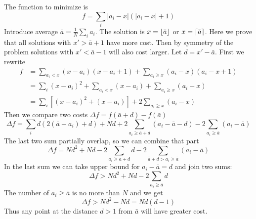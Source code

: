 \documentclass[a4paper,11pt]{article}
\DeclarePairedDelimiter\ceil{\lceil}{\rceil}
\DeclarePairedDelimiter\floor{\lfloor}{\rfloor}
\newcommand{\abs}[1]{\lvert #1 \rvert}
\begin{document}
The function to minimize is
\begin{equation}
  f = \sum_i \abs{a_i - x} (\abs{a_i - x} + 1)
\end{equation}
Introduce average $\bar{a}=\frac{1}{N}\sum_i a_i$.
The solution is $x=\floor{\bar a}$ or $x=\ceil{\bar a}$.
Here we prove that all solutions with $x'>\bar{a}+1$ have more cost.
Then by symmetry of the problem solutions with $x'<\bar{a}-1$ will also cost larger. Let $d=x'-\bar{a}$.
First we rewrite
\begin{align}
  f & = \sum_{a_i < x} (x - a_i)(x - a_i + 1) + \sum_{a_i \geq x} (a_i - x)(a_i - x + 1) \\
    & = \sum_i (x - a_i)^2 +  \sum_{a_i < x} (x - a_i) + \sum_{a_i \geq x} (a_i - x) \\
    & = \sum_i [ (x - a_i)^2 +  (x - a_i) ] + 2\sum_{a_i \geq x} (a_i - x)
\end{align}
Then we compare two costs $\Delta f = f(\bar{a} + d) - f(\bar{a})$
\begin{equation}
  \Delta f = \sum_i d (2 (\bar{a} - a_i) +d) + Nd 
  +2\sum_{a_i \geq \bar{a}+d } (a_i -\bar{a}-d)  -2\sum_{a_i\geq{\bar a}} (a_i -\bar{a}) 
\end{equation}
The last two sum partially overlap, so we can combine that part
\begin{equation}
  \Delta f = Nd^2 + Nd 
  -2\sum_{a_i \geq \bar{a}+d }d  -2\sum_{\bar{a} + d > a_i \geq \bar{a}} (a_i -\bar{a})
\end{equation}
In the last sum we can take upper bound for $a_i-\bar{a} = d$ and join two sums:
\begin{equation}
  \Delta f > Nd^2 + Nd -2\sum_{a_i \geq \bar{a}} d
\end{equation}
The number of $a_i \geq \bar{a}$ is no more than $N$ and we get
\begin{equation}
  \Delta f > Nd^2 - Nd = N d (d - 1)
\end{equation}
Thus any point at the distance $d>1$ from $\bar{a}$ will have greater cost.
\end{document}
